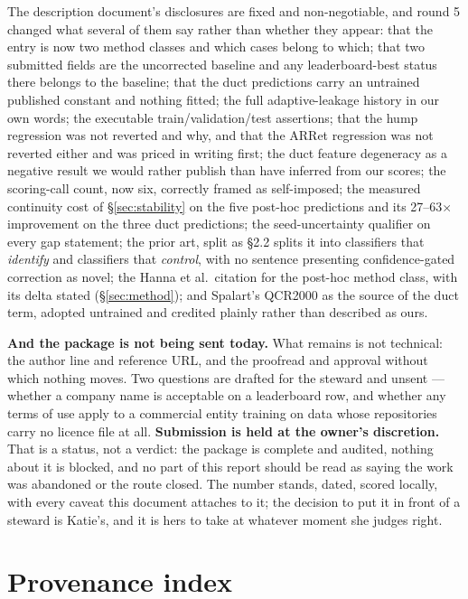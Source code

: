 \documentclass[11pt,a4paper]{article}
\newcommand{\breakus}{\textunderscore\allowbreak}
\newcommand{\code}[1]{{\small\ttfamily\let\_\breakus #1}}
\begin{document}
The description document's disclosures are fixed and non-negotiable, and round 5 changed
what several of them say rather than whether they appear: that the entry is now two method
classes and which cases belong to which; that two submitted fields are the uncorrected
baseline and any leaderboard-best status there belongs to the baseline; that the duct
predictions carry an untrained published constant and nothing fitted; the full
adaptive-leakage history in our own words; the executable train/validation/test assertions;
that the hump regression was not reverted and why, and that the \code{AR\_14\_Ret\_180}
regression was not reverted either and was priced in writing first; the duct feature
degeneracy as a negative result we would rather publish than have inferred from our scores;
the scoring-call count, now six, correctly framed as self-imposed; the measured continuity
cost of \S\ref{sec:stability} on the five post-hoc predictions and its 27--63$\times$
improvement on the three duct predictions; the seed-uncertainty qualifier on every gap
statement; the prior art, split as \S2.2 splits it into classifiers that \emph{identify}
and classifiers that \emph{control}, with no sentence presenting confidence-gated
correction as novel; the Hanna et al.\ citation for the post-hoc method class, with its
delta stated (\S\ref{sec:method}); and Spalart's QCR2000 as the source of the duct term,
adopted untrained and credited plainly rather than described as ours.

\medskip
\noindent \textbf{And the package is not being sent today.} What remains is not technical:
the author line and reference URL, and the proofread and approval without which nothing
moves. Two questions are drafted for the steward and unsent --- whether a company name is
acceptable on a leaderboard row, and whether any terms of use apply to a commercial entity
training on data whose repositories carry no licence file at all. \textbf{Submission is
held at the owner's discretion.} That is a status, not a verdict: the package is complete
and audited, nothing about it is blocked, and no part of this report should be read as
saying the work was abandoned or the route closed. The number stands, dated, scored
locally, with every caveat this document attaches to it; the decision to put it in front of
a steward is Katie's, and it is hers to take at whatever moment she judges right.

\appendix
\section{Provenance index}
\end{document}
